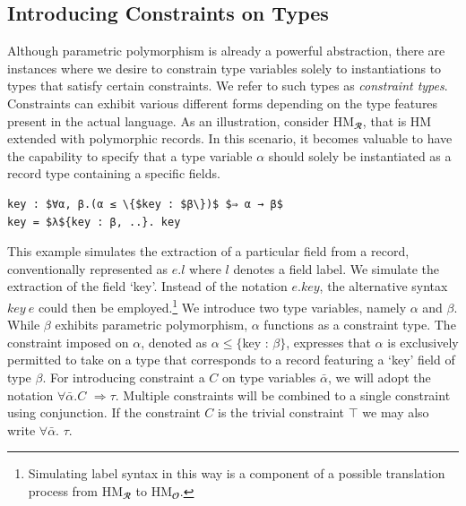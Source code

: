 \documentclass[runningheads]{llncs}
\begin{document}
\subsection{Introducing Constraints on Types}
Although parametric polymorphism is already a powerful abstraction, there are
instances where we desire to constrain type variables solely to instantiations
to types that satisfy certain constraints.
We refer to such types as \emph{constraint types}.
Constraints can exhibit various different forms depending on the type features
present in the actual language.
As an illustration, consider HM$_𝓡$, that is HM extended with
polymorphic records\cite{hmr}.
In this scenario, it becomes valuable to have the capability to specify that a
type variable $α$
should solely be instantiated as a record type containing a specific fields.
\begin{example}
  \begin{lstlisting}
key : $∀α, β.(α ≤ \{$key : $β\})$ $⇒ α → β$
key = $λ${key : β, ..}. key
  \end{lstlisting}
\end{example}
This example simulates the extraction of a particular field from a record,
conventionally
represented as $e.l$ where $l$ denotes a field label.
We simulate the extraction of  the field `key'.
Instead of the notation $e.key$, the alternative syntax $key \ e$ could then be
employed.\footnote{
  Simulating label syntax in this way is a component of a possible translation
  process from HM$_𝓡$ to HM$_𝓞$.

}
We introduce two type variables, namely $α$ and $β$. While $β$ exhibits
parametric polymorphism, $α$ functions as a constraint type.
The constraint imposed on $α$, denoted as $α ≤ \{$key : $β\}$, expresses that
$α$ is exclusively permitted to take on a type that corresponds to a record
featuring a `key' field of type $β$.
For introducing constraint a $C$ on type variables $\bar{α}$, we will adopt the
notation $∀\bar{α}.C$ $⇒ τ$.
Multiple constraints will be combined to a single
constraint using conjunction. If the constraint $C$ is the trivial constraint
$⊤$ we may also write $∀\bar{α}.$ $τ$.
\end{document}
